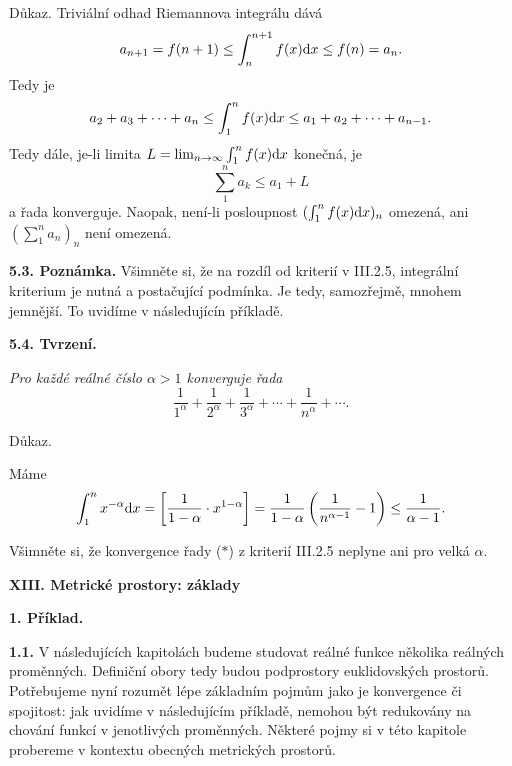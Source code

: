 \documentclass[12pt]{article}
\begin{document}
{{Důkaz.} Triviální odhad Riemannova integrálu dává
$$
a_{n+1}=f(n+1)\leq \int_n^{n+1}f(x)\d x\leq f(n)=a_n.
$$
Tedy je
$$
a_2+a_3+\cdots+a_n\leq\int_1^nf(x)\d x \leq a_1+ a_2+\cdots+a_{n-1}. 
   $$
Tedy dále, je-li limita $L=\lim_{n\to\infty}\int_1^nf(x)\d x$ konečná, je
$$
\sum_{1}^na_k\leq a_1+L
$$
a řada konverguje. Naopak, není-li posloupnost 
$(\int_1^nf(x)\d x )_n$ omezená, ani
$(\sum_1^na_n)_n$ není omezená.\sq

\bigskip

{\bf 5.3. Poznámka.} Všimněte si, že na rozdíl od kriterií v III.2.5, integrální kriterium
je nutná a postačující podmínka. Je tedy, samozřejmě, mnohem jemnější. To uvidíme v následujícín příkladě.

\bigskip

{\bf 5.4. Tvrzení.} {\em Pro každé reálné číslo $\alpha>1$ konverguje řada
\begin{equation}
\frac1{1^\alpha}+\frac1{2^\alpha}+\frac1{3^\alpha}+\cdots+\frac1{n^\alpha}+\cdots. \tag{$*$}
\end{equation}


Důkaz.} Máme
$$
\int_1^nx^{-\alpha}\d x=\left[\frac{1}{1-\alpha}\cdot x^{1-\alpha}\right]=\frac{1}{1-\alpha}\left(\frac1{n^{\alpha-1}}-1\right)\leq\frac1{\alpha-1}.
$$\sq

\bigskip

Všimněte si, že konvergence řady ($*$) z kriterií III.2.5 neplyne ani pro velká  $\alpha$.

\newpage


 \centerline{\Large\bf XIII. Metrické prostory: základy} 
 
 \vskip10mm
 
 
 \def\d{\text{d}}
 
 
 
 {\large\bf 1. Příklad.}
 
 \bigskip
 
{\bf 1.1.} V následujících kapitolách budeme studovat reálné funkce několika reálných proměnných. Definiční obory tedy budou podprostory euklidovských prostorů. Potřebujeme nyní rozumět lépe základním pojmům jako je konvergence či spojitost: jak uvidíme v následujícím příklad\v e, nemohou být redukovány na chování funkcí v jenotlivých proměnných. Některé pojmy si v této kapitole probereme v kontextu obecných metrických prostorů.


\bigskip

}
\end{document}
